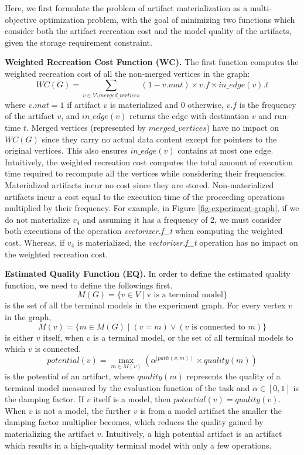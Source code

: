 Here, we first formulate the problem of artifact materialization as a multi-objective optimization problem, with the goal of minimizing two functions which consider both the artifact recreation cost and the model quality of the artifacts, given the storage requirement constraint.

\textbf{Weighted Recreation Cost Function (WC).} 
The first function computes the weighted recreation cost of all the non-merged vertices in the graph:
\[
WC(G) =  \sum\limits_{v \in V\setminus merged\_vertices}  (1-v.mat) \times v.f \times in\_edge(v).t
\]
where $v.mat = 1$ if artifact $v$ is materialized and $0$ otherwise, $v.f$ is the frequency of the artifact $v$, and $in\_edge(v)$ returns the edge with destination $v$ and run-time $t$.
Merged vertices (represented by $merged\_vertices$) have no impact on $WC(G)$ since they carry no actual data content except for pointers to the original vertices.
This also ensures $in\_edge(v)$ contains at most one edge.
Intuitively, the weighted recreation cost computes the total amount of execution time required to recompute all the vertices while considering their frequencies.
Materialized artifacts incur no cost since they are stored.
Non-materialized artifacts incur a cost equal to the execution time of the proceeding operations multiplied by their frequency.
For example, in Figure \ref{fig-experiment-graph}, if we do not materialize $v_4$ and assuming it has a frequency of 2, we must consider both executions of the operation \textit{vectorizer.f\_t}  when computing the weighted cost.
Whereas, if $v_4$ is materialized, the \textit{vectorizer.f\_t} operation has no impact on the weighted recreation cost.

\textbf{Estimated Quality Function (EQ).} 
In order to define the estimated quality function, we need to define the followings first.
\[
M(G) = \{v \in V \mid \text{v is a terminal model}\}
\]
is the set of all the terminal models in the experiment graph.
For every vertex $v$ in the graph, 
\[
M(v) = \{m \in M(G) \mid (v = m) \vee (v \text{ is connected to } m)\}
\]
is either $v$ itself, when $v$ is a terminal model, or the set of all terminal models to which $v$ is connected.
\[
potential(v) = \max\limits_{m \in M(v)} ( \alpha ^ {\mid path(v,m) \mid} \times quality(m) )
\]
is the potential of an artifact, where $quality(m)$ represents the quality of a terminal model measured by the evaluation function of the task and $\alpha \in [0,1]$ is the damping factor.
If $v$ itself is a model, then $potential(v) = quality(v)$.
When $v$ is not a model, the further $v$ is from a model artifact the smaller the damping factor multiplier becomes, which reduces the quality gained by materializing the artifact $v$.
Intuitively, a high potential artifact is an artifact which results in a high-quality terminal model with only a few operations.

